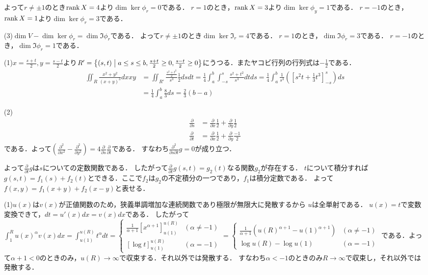 \documentclass[
		book,
		head_space=20mm,
		foot_space=20mm,
		gutter=10mm,
		line_length=190mm
]{jlreq}
\begin{document}
よって$r\neq \pm 1$のとき$\rank X=4$より$\dim \ker \phi_r=0$である．
$r=1$のとき，$\rank X=3$より$\dim \ker \phi_y=1$である．
$r=-1$のとき，$\rank X=1$より$\dim \ker \phi_r=3$である．

(3)$\dim V-\dim \ker \phi_r=\dim \Im \phi_r$である．
よって$r\neq \pm 1$のとき$\dim \ker \Im_r=4$である．
$r=1$のとき，$\dim \Im \phi_r=3$である．
$r=-1$のとき，$\dim \Im \phi_r=1$である．

(1)$x=\frac{s+t}{2},y=\frac{s-t}{2}$より$R'=\left\{ (s,t)\mathrel{}\middle|\mathrel{}a\le s\le b,\frac{s+t}{2}\ge 0,\frac{s-t}{2}\ge 0 \right\}$にうつる．またヤコビ行列の行列式は$-\frac{1}{2}$である．
\begin{align}
    \iint_R \frac{x^2+y^2}{(x+y)^3}dxxy&=\iint_{R'} \frac{\frac{s^2+t^2}{2}}{s^3}\frac{1}{2}dsdt=\frac{1}{4}\int_a^b\int_{-s}^s \frac{s^2+t^2}{s^3}dtds=\frac{1}{4}\int_a^b \frac{1}{s^3}\left( \left[s^2t+ \frac{1}{3}t^3 \right]_{-s}^s \right)ds\\
    &=\frac{1}{4}\int_a^b\frac{8}{3}ds=\frac{2}{3}(b-a)
\end{align}

(2)
\begin{align}
    \frac{\partial }{\partial s}&=\frac{\partial}{\partial x}\frac{1}{2}+\frac{\partial}{\partial y}\frac{1}{2}\\
    \frac{\partial }{\partial t}&=\frac{\partial}{\partial x}\frac{1}{2}+\frac{\partial}{\partial y}\frac{-1}{2}
\end{align}
である．よって$\left( \frac{\partial^2}{\partial x^2}-\frac{\partial^2}{\partial y^2} \right)=4\frac{\partial}{\partial s}\frac{\partial}{\partial t}$である．
すなわち$\frac{\partial^2}{\partial s\partial t} g=0$が成り立つ．

よって$\frac{\partial}{\partial t}g$は$s$についての定数関数である．
したがって$\frac{\partial}{\partial t}g(s,t)=g_2(t)$なる関数$g_2$が存在する．
$t$について積分すれば$g(s,t)=f_1(s)+f_2(t)$とできる．ここで$f_2$は$g_2$の不定積分の一つであり，$f_1$は積分定数である．
よって$f(x,y)=f_1(x+y)+f_2(x-y)$と表せる．

(1)$u(x)$は$v(x)$が正値関数のため，狭義単調増加な連続関数であり極限が無限大に発散するから
$u$は全単射である．
$u(x)=t$で変数変換できて，$dt=u'(x)dx=v(x)dx$である．
したがって$\int_1^R u(x)^{\alpha}v(x)dx=\int_{u(1)}^{u(R)} t^\alpha dt=\begin{cases}
    \frac{1}{\alpha+1}\left[ x^{\alpha+1} \right]_{u(1)}^{u(R)} &(\alpha\neq -1)\\
    \left[ \log t \right]_{u(1)}^{u(R)}& (\alpha=-1)
\end{cases}=\begin{cases}
    \frac{1}{\alpha+1}({u(R)}^{\alpha+1}-{u(1)}^{\alpha+1}) &(\alpha\neq -1)\\
    \log u(R)-\log u(1)& (\alpha=-1)
\end{cases}$
である．よって$\alpha+1<0$のときのみ，$u(R)\rightarrow \infty$で収束する．それ以外では発散する．
すなわち$\alpha<-1$のときのみ$R\to \infty$で収束し，それ以外では発散する．
\end{document}
